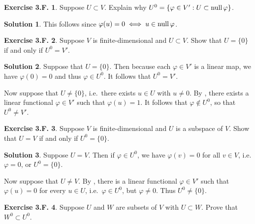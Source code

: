 \documentclass[12pt]{article}
\theoremstyle{definition}
\theoremstyle{exercise}
\newtheorem{exercise}{Exercise 3.F.}
\theoremstyle{solution}
\newtheorem*{solution}{Solution}
\newcommand{\Null}{\text{null\,}}
\begin{document}
\begin{exercise}
\label{ex:17}
    Suppose \( U \subset V \). Explain why \( U^0 = \{ \varphi \in V' : U \subset \Null \varphi \} \).
\end{exercise}

\begin{solution}
    This follows since \( \varphi(u) = 0 \iff u \in \Null \varphi \).
\end{solution}

\begin{exercise}
\label{ex:18}
    Suppose \( V \) is finite-dimensional and \( U \subset V \). Show that \( U = \{ 0 \} \) if and only if \( U^0 = V' \).
\end{exercise}

\begin{solution}
    Suppose that \( U = \{ 0 \} \). Then because each \( \varphi \in V' \) is a linear map, we have \( \varphi(0) = 0 \) and thus \( \varphi \in U^0 \). It follows that \( U^0 = V' \).

    Now suppose that \( U \neq \{ 0 \} \), i.e.\ there exists \( u \in U \) with \( u \neq 0 \). By , there exists a linear functional \( \varphi \in V' \) such that \( \varphi(u) = 1 \). It follows that \( \varphi \not\in U^0 \), so that \( U^0 \neq V' \).
\end{solution}

\begin{exercise}
\label{ex:19}
    Suppose \( V \) is finite-dimensional and \( U \) is a subspace of \( V \). Show that \( U = V \) if and only if \( U^0 = \{ 0 \} \).
\end{exercise}

\begin{solution}
    Suppose \( U = V \). Then if \( \varphi \in U^0 \), we have \( \varphi(v) = 0 \) for all \( v \in V \), i.e. \( \varphi = 0 \), or \( U^0 = \{ 0 \} \).

    Now suppose that \( U \neq V \). By , there is a linear functional \( \varphi \in V' \) such that \( \varphi(u) = 0 \) for every \( u \in U \), i.e.\ \( \varphi \in U^0 \), but \( \varphi \neq 0 \). Thus \( U^0 \neq \{ 0 \} \).
\end{solution}

\begin{exercise}
\label{ex:20}
    Suppose \( U \) and \( W \) are subsets of \( V \) with \( U \subset W \). Prove that \( W^0 \subset U^0 \).
\end{exercise}
\end{document}
